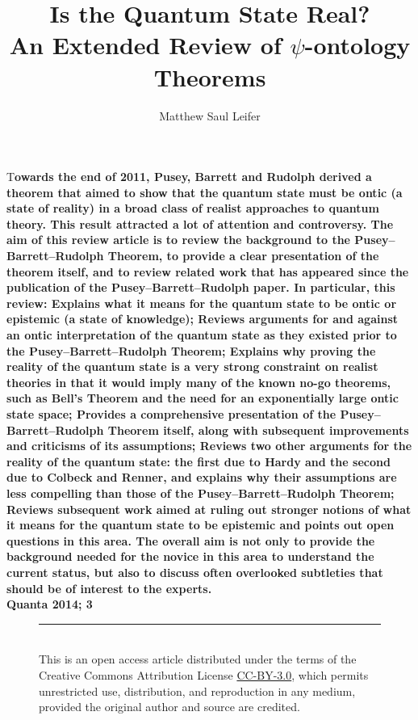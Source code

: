 \documentclass[DIV=calc,fontsize=12pt]{scrartcl} %
\title{Is the Quantum State Real?\\An Extended Review of $\psi$-ontology Theorems}					%
\author{Matthew Saul Leifer\\[8pt]}											%
\date{}																				%
\theoremstyle{definition}
\theoremstyle{plain}
\newcommand{\initial}[1]{%
\lettrine[lines=3,lhang=0.3,nindent=0em]{
\color[HTML]{31ADF3}
{\textsf{#1}}}{}}
\begin{document}
\maketitle
\thispagestyle{fancy} 			%
\initial{T}\textbf{owards the end of 2011, Pusey, Barrett and Rudolph derived a theorem that aimed to show that the quantum state must be ontic (a state of reality) in a broad class of realist approaches to quantum theory. This result attracted a lot of attention and controversy. The aim of this review article is to review the background to the Pusey--Barrett--Rudolph Theorem, to provide a clear presentation of the theorem itself, and to review related work that has appeared since the publication of the Pusey--Barrett--Rudolph paper. In particular, this review:
Explains what it means for the quantum state to be ontic or epistemic (a state of knowledge);
Reviews arguments for and against an ontic interpretation of the quantum state as they existed prior to the Pusey--Barrett--Rudolph Theorem;
Explains why proving the reality of the quantum state is a very strong constraint on realist theories in that it would imply many of the known no-go theorems, such as Bell's Theorem and the need for an exponentially large ontic state space;
Provides a comprehensive presentation of the Pusey--Barrett--Rudolph Theorem itself, along with subsequent improvements and criticisms of its assumptions;
Reviews two other arguments for the reality of the quantum state: the first due to Hardy and the second due to Colbeck and Renner, and explains why their assumptions are less compelling than those of the Pusey--Barrett--Rudolph Theorem;
Reviews subsequent work aimed at ruling out stronger notions of what it means for the quantum state to be epistemic and points out open questions in this area. The overall aim is not only to provide the background needed for the novice in this area to understand the current status, but also to discuss often overlooked subtleties that should be of interest to the experts.\\ Quanta 2014; 3}
\begin{figure}[b!]
\rule{245 pt}{0.5 pt}\\[3pt]
\footnotesize{This is an open access article distributed under the terms of the Creative Commons Attribution License \href{http://creativecommons.org/licenses/by/3.0/}{CC-BY-3.0}, which permits unrestricted use, distribution, and reproduction in any medium, provided the original author and source are credited.}
\end{figure}
\end{document}
